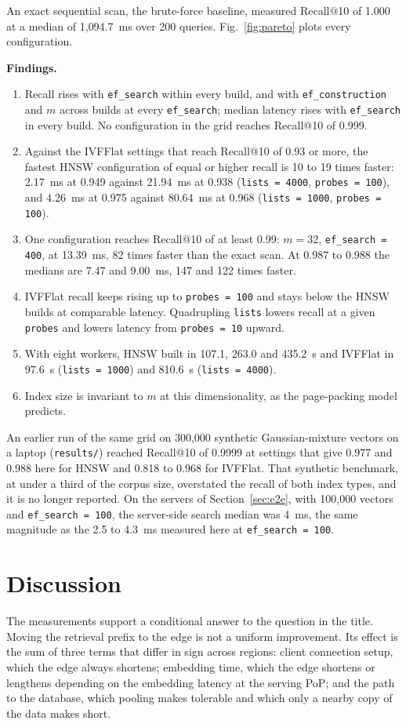 \documentclass[conference]{IEEEtran}
\newcommand{\code}[1]{\texttt{#1}}
\begin{document}
An exact sequential scan, the brute-force baseline, measured Recall@10 of 1.000 at a median of
1{,}094.7~ms over 200 queries. Fig.~\ref{fig:pareto} plots every configuration.

\textbf{Findings.}
\begin{enumerate}
\item Recall rises with \code{ef\_search} within every build, and with \code{ef\_construction} and
$m$ across builds at every \code{ef\_search}; median latency rises with \code{ef\_search} in every
build. No configuration in the grid reaches Recall@10 of 0.999.
\item Against the IVFFlat settings that reach Recall@10 of 0.93 or more, the fastest HNSW
configuration of equal or higher recall is 10 to 19 times faster: 2.17~ms at 0.949 against 21.94~ms at 0.938 (\code{lists = 4000}, \code{probes = 100}), and
4.26~ms at 0.975 against 80.64~ms at 0.968 (\code{lists = 1000}, \code{probes = 100}).
\item One configuration reaches Recall@10 of at least 0.99: $m = 32$, \code{ef\_search = 400}, at
13.39~ms, 82 times faster than the exact scan. At 0.987 to 0.988 the medians are 7.47 and
9.00~ms, 147 and 122 times faster.
\item IVFFlat recall keeps rising up to \code{probes = 100} and stays below the HNSW builds at
comparable latency. Quadrupling \code{lists} lowers recall at a given \code{probes} and lowers
latency from \code{probes = 10} upward.
\item With eight workers, HNSW built in 107.1, 263.0 and 435.2~s and IVFFlat in 97.6~s
(\code{lists = 1000}) and 810.6~s (\code{lists = 4000}).
\item Index size is invariant to $m$ at this dimensionality, as the page-packing model predicts.
\end{enumerate}
An earlier run of the same grid on 300{,}000 synthetic Gaussian-mixture vectors on a laptop
(\code{results/}) reached Recall@10 of 0.9999 at settings that give 0.977 and 0.988 here for HNSW and 0.818 to
0.968 for IVFFlat. That synthetic benchmark, at under a third of the corpus size, overstated the
recall of both index types, and it is no longer reported. On the
servers of Section~\ref{sec:e2e}, with 100{,}000 vectors and \code{ef\_search = 100}, the
server-side search median was 4~ms, the same magnitude as the 2.5 to 4.3~ms measured here at
\code{ef\_search = 100}.

\section{Discussion}
The measurements support a conditional answer to the question in the title. Moving the retrieval
prefix to the edge is not a uniform improvement. Its effect is the sum of three terms that differ
in sign across regions: client connection setup, which the edge always shortens; embedding time,
which the edge shortens or lengthens depending on the embedding latency at the serving PoP; and
the path to the database, which pooling makes tolerable and which only a nearby copy of the data
makes short.
\end{document}
